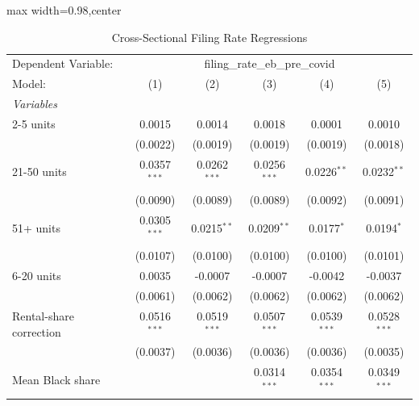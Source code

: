 
\begin{table}[htbp]
   \caption{\label{tab:xsec_filing} Cross-Sectional Filing Rate Regressions}
   \centering
   \scriptsize
   \begin{adjustbox}{max width=0.98\textwidth,center}
      \begin{tabular}{lccccc}
         \tabularnewline \midrule \midrule
         Dependent Variable: & \multicolumn{5}{c}{filing\_rate\_eb\_pre\_covid}\\
         Model:                                  & (1)            & (2)            & (3)            & (4)             & (5)\\  
         \midrule
         \emph{Variables}\\
         2-5 units                               & 0.0015         & 0.0014         & 0.0018         & 0.0001          & 0.0010\\   
                                                 & (0.0022)       & (0.0019)       & (0.0019)       & (0.0019)        & (0.0018)\\   
         21-50 units                             & 0.0357$^{***}$ & 0.0262$^{***}$ & 0.0256$^{***}$ & 0.0226$^{**}$   & 0.0232$^{**}$\\   
                                                 & (0.0090)       & (0.0089)       & (0.0089)       & (0.0092)        & (0.0091)\\   
         51+ units                               & 0.0305$^{***}$ & 0.0215$^{**}$  & 0.0209$^{**}$  & 0.0177$^{*}$    & 0.0194$^{*}$\\   
                                                 & (0.0107)       & (0.0100)       & (0.0100)       & (0.0100)        & (0.0101)\\   
         6-20 units                              & 0.0035         & -0.0007        & -0.0007        & -0.0042         & -0.0037\\   
                                                 & (0.0061)       & (0.0062)       & (0.0062)       & (0.0062)        & (0.0062)\\   
         Rental-share correction                 & 0.0516$^{***}$ & 0.0519$^{***}$ & 0.0507$^{***}$ & 0.0539$^{***}$  & 0.0528$^{***}$\\   
                                                 & (0.0037)       & (0.0036)       & (0.0036)       & (0.0036)        & (0.0035)\\   
         Mean Black share                        &                &                & 0.0314$^{***}$ & 0.0354$^{***}$  & 0.0349$^{***}$\\   

\end{tabular}
\end{adjustbox}
\end{table}
